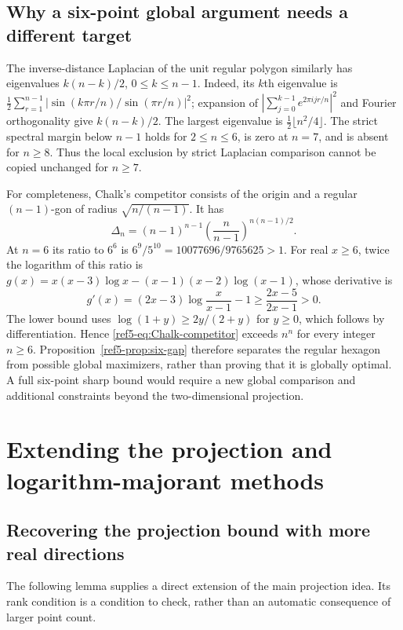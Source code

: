 \documentclass[11pt]{article}
\theoremstyle{remark}
\numberwithin{equation}{section}
\begin{document}
\subsection{Why a six-point global argument needs a different target}
The inverse-distance Laplacian of the unit regular polygon similarly
has eigenvalues $k(n-k)/2$, $0\le k\le n-1$.
Indeed, its $k$th eigenvalue is
$\frac12\sum_{r=1}^{n-1}
|\sin(k\pi r/n)/\sin(\pi r/n)|^2$; expansion of
$|\sum_{j=0}^{k-1}e^{2\pi i jr/n}|^2$ and Fourier orthogonality
give $k(n-k)/2$.
The largest eigenvalue is $\frac12\lfloor n^2/4\rfloor$.
The strict spectral margin below $n-1$ holds for $2\le n\le6$, is zero
at $n=7$, and is absent for $n\ge8$. Thus the local exclusion by strict
Laplacian comparison cannot be copied unchanged for $n\ge7$.

For completeness, Chalk's competitor consists of the origin and a
regular $(n-1)$-gon of radius $\sqrt{n/(n-1)}$. It has
\begin{equation}\label{ref5-eq:Chalk-competitor}
 \Delta_n=(n-1)^{n-1}
       \left(\frac n{n-1}\right)^{n(n-1)/2}.
\end{equation}
At $n=6$ its ratio to $6^6$ is
$6^9/5^{10}=10077696/9765625>1$.
For real $x\ge6$, twice the logarithm of this ratio is
$g(x)=x(x-3)\log x-(x-1)(x-2)\log(x-1)$, whose derivative is
\[
 g'(x)=(2x-3)\log\frac{x}{x-1}-1
 \ge\frac{2x-5}{2x-1}>0.
\]
The lower bound uses
$\log(1+y)\ge2y/(2+y)$ for $y\ge0$, which follows by
differentiation. Hence \eqref{ref5-eq:Chalk-competitor} exceeds $n^n$
for every integer $n\ge6$.
Proposition~\ref{ref5-prop:six-gap} therefore separates the regular hexagon
from possible global maximizers, rather than proving that it is
globally optimal. A full six-point sharp bound would require a new
global comparison and additional constraints beyond the
two-dimensional projection.



\section{Extending the projection and logarithm-majorant methods}
\subsection{Recovering the projection bound with more real directions}
The following lemma supplies a direct extension of the main
projection idea. Its rank condition is a condition to check, rather
than an automatic consequence of larger point count.
\end{document}

